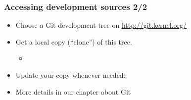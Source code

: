 \begin{frame}
  \frametitle{Accessing development sources 2/2}
  \begin{itemize}
  \item Choose a Git development tree on \url{http://git.kernel.org/}
  \item Get a local copy (“clone”) of this tree.
    \begin{itemize}
    \item {}
    \end{itemize}
  \item Update your copy whenever needed: 
  \item More details in our chapter about Git
  \end{itemize}
\end{frame}
